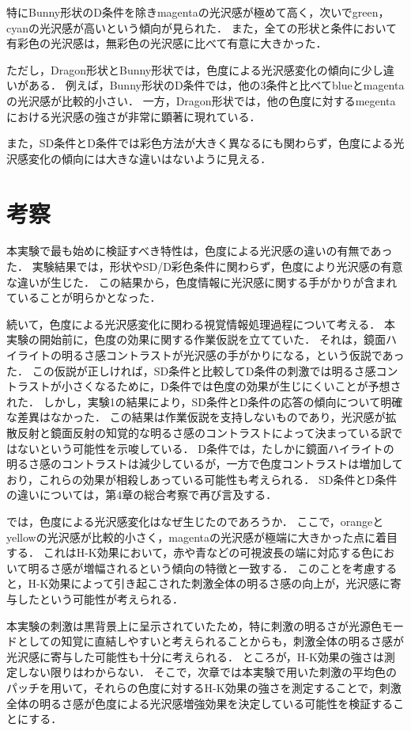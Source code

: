             特にBunny形状のD条件を除きmagentaの光沢感が極めて高く，次いでgreen，cyanの光沢感が高いという傾向が見られた．
            また，全ての形状と条件において有彩色の光沢感は，無彩色の光沢感に比べて有意に大きかった．


            ただし，Dragon形状とBunny形状では，色度による光沢感変化の傾向に少し違いがある．
            例えば，Bunny形状のD条件では，他の3条件と比べてblueとmagentaの光沢感が比較的小さい．
            一方，Dragon形状では，他の色度に対するmegentaにおける光沢感の強さが非常に顕著に現れている．

            また，SD条件とD条件では彩色方法が大きく異なるにも関わらず，色度による光沢感変化の傾向には大きな違いはないように見える．


    \section{考察}
        本実験で最も始めに検証すべき特性は，色度による光沢感の違いの有無であった．
        実験結果では，形状やSD/D彩色条件に関わらず，色度により光沢感の有意な違いが生じた．
        この結果から，色度情報に光沢感に関する手がかりが含まれていることが明らかとなった．
        
        続いて，色度による光沢感変化に関わる視覚情報処理過程について考える．
        本実験の開始前に，色度の効果に関する作業仮説を立てていた．
        それは，鏡面ハイライトの明るさ感コントラストが光沢感の手がかりになる，という仮説であった．
        この仮説が正しければ，SD条件と比較してD条件の刺激では明るさ感コントラストが小さくなるために，D条件では色度の効果が生じにくいことが予想された．
        しかし，実験1の結果により，SD条件とD条件の応答の傾向について明確な差異はなかった．
        この結果は作業仮説を支持しないものであり，光沢感が拡散反射と鏡面反射の知覚的な明るさ感のコントラストによって決まっている訳ではないという可能性を示唆している．
        D条件では，たしかに鏡面ハイライトの明るさ感のコントラストは減少しているが，一方で色度コントラストは増加しており，これらの効果が相殺しあっている可能性も考えられる．
        SD条件とD条件の違いについては，第4章の総合考察で再び言及する．

        では，色度による光沢感変化はなぜ生じたのであろうか．
        ここで，orangeとyellowの光沢感が比較的小さく，magentaの光沢感が極端に大きかった点に着目する．
        これはH-K効果において，赤や青などの可視波長の端に対応する色において明るさ感が増幅されるという傾向\cite{HKeffect}の特徴と一致する．
        このことを考慮すると，H-K効果によって引き起こされた刺激全体の明るさ感の向上が，光沢感に寄与したという可能性が考えられる．

        本実験の刺激は黒背景上に呈示されていたため，特に刺激の明るさが光源色モード\cite{LightMode}としての知覚に直結しやすいと考えられることからも，刺激全体の明るさ感が光沢感に寄与した可能性も十分に考えられる．
        ところが，H-K効果の強さは測定しない限りはわからない．
        そこで，次章では本実験で用いた刺激の平均色のパッチを用いて，それらの色度に対するH-K効果の強さを測定することで，刺激全体の明るさ感が色度による光沢感増強効果を決定している可能性を検証することにする．

    \newpage
